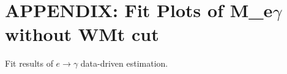 \section{APPENDIX: Fit Plots of M_{e$\gamma$} without WMt cut}
\label{sec:EtogammaFitPlotsNoWMtCut}

Fit results of $e \rightarrow \gamma$ data-driven estimation.

  


